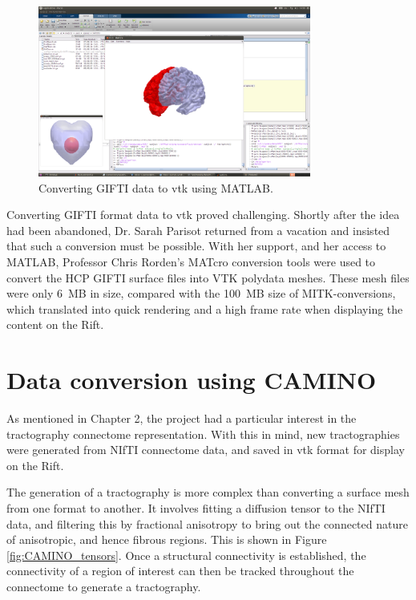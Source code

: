 \documentclass[MSc,paper=a4,pagesize=auto]{icldt}
\begin{document}
\begin{figure}[htbp!]
    \centering
    \includegraphics[width=0.8\textwidth]{resources/MATLAB_conversion}
    \caption{Converting GIFTI data to vtk using MATLAB.}
    \label{fig:MATLAB_conversion}
\end{figure}

Converting GIFTI format data to vtk proved challenging. Shortly after the idea had been abandoned, Dr. Sarah Parisot returned from a vacation and insisted that such a conversion must be possible. With her support, and her access to MATLAB, Professor Chris Rorden's MATcro conversion tools were used to convert the HCP GIFTI surface files into VTK polydata meshes. These mesh files were only \SI{6}{MB} in size, compared with the \SI{100}{MB} size of MITK-conversions, which translated into quick rendering and a high frame rate when displaying the content on the Rift.

\section{Data conversion using CAMINO}
As mentioned in Chapter 2, the project had a particular interest in the tractography connectome representation. With this in mind, new tractographies were generated from NIfTI connectome data, and saved in vtk format for display on the Rift.

The generation of a tractography is more complex than converting a surface mesh from one format to another. It involves fitting a diffusion tensor to the NIfTI data, and filtering this by fractional anisotropy to bring out the connected nature of anisotropic, and hence fibrous regions. This is shown in Figure \ref{fig:CAMINO_tensors}. Once a structural connectivity is established, the connectivity of a region of interest can then be tracked throughout the connectome to generate a tractography.
\end{document}
